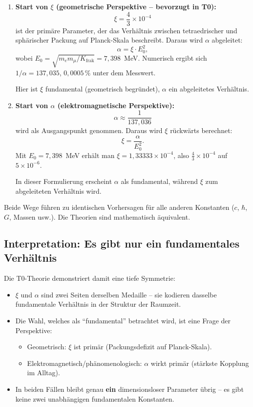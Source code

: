 \begin{enumerate}
	\item \textbf{Start von \(\xi\) (geometrische Perspektive – bevorzugt in T0):}
	\[
	\xi = \frac{4}{3} \times 10^{-4}
	\]
	ist der primäre Parameter, der das Verhältnis zwischen tetraedrischer und sphärischer Packung auf Planck-Skala beschreibt. Daraus wird \(\alpha\) abgeleitet:
	\[
	\alpha = \xi \cdot E_0^2 ,
	\]
	wobei \(E_0 = \sqrt{m_e m_\mu/K_{\text{frak}}} = 7{,}398\)~MeV. Numerisch ergibt sich \(1/\alpha = 137{,}035\), $0{,}0005\,\%$ unter dem Messwert.
	
	Hier ist \(\xi\) fundamental (geometrisch begründet), \(\alpha\) ein abgeleitetes Verhältnis.
	
	\item \textbf{Start von \(\alpha\) (elektromagnetische Perspektive):}
	\[
	\alpha \approx \frac{1}{137{,}036}
	\]
	wird als Ausgangspunkt genommen. Daraus wird \(\xi\) rückwärts berechnet:
	\[
	\xi = \frac{\alpha}{E_0^2} .
	\]
	Mit \(E_0 = 7{,}398\)~MeV erhält man \(\xi = 1{,}33333\times10^{-4}\), also \(\frac{4}{3} \times 10^{-4}\) auf $5\times10^{-6}$.
	
	In dieser Formulierung erscheint \(\alpha\) als fundamental, während \(\xi\) zum abgeleiteten Verhältnis wird.
\end{enumerate}

Beide Wege führen zu identischen Vorhersagen für alle anderen Konstanten (\(c\), \(\hbar\), \(G\), Massen usw.). Die Theorien sind mathematisch äquivalent.

\subsection{Interpretation: Es gibt nur ein fundamentales Verhältnis}

Die T0-Theorie demonstriert damit eine tiefe Symmetrie:
\begin{itemize}
	\item \(\xi\) und \(\alpha\) sind zwei Seiten derselben Medaille – sie kodieren dasselbe fundamentale Verhältnis in der Struktur der Raumzeit.
	\item Die Wahl, welches als ``fundamental'' betrachtet wird, ist eine Frage der Perspektive:
	\begin{itemize}
		\item Geometrisch: \(\xi\) ist primär (Packungsdefizit auf Planck-Skala).
		\item Elektromagnetisch/phänomenologisch: \(\alpha\) wirkt primär (stärkste Kopplung im Alltag).
	\end{itemize}
	\item In beiden Fällen bleibt genau \textbf{ein} dimensionsloser Parameter übrig – es gibt keine zwei unabhängigen fundamentalen Konstanten.
\end{itemize}

